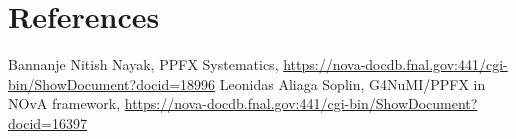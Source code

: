 \documentclass[12pt,a4paper,final]{iopart}
\begin{document}
\begin{table}
  \centering
  \caption{Computing resources used by jobs with all and partially-enabled knobs.}
\end{table}

\section*{References}
\begin{thebibliography}{10}
   Bannanje Nitish Nayak, PPFX Systematics, \url{https://nova-docdb.fnal.gov:441/cgi-bin/ShowDocument?docid=18996}
   Leonidas Aliaga Soplin, G4NuMI/PPFX in NOvA framework, \url{https://nova-docdb.fnal.gov:441/cgi-bin/ShowDocument?docid=16397}
\end{thebibliography}
  
\end{document}
